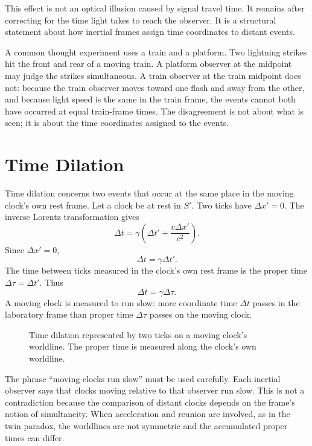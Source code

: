 This effect is not an optical illusion caused by signal travel time. It remains
after correcting for the time light takes to reach the observer. It is a
structural statement about how inertial frames assign time coordinates to
distant events.

A common thought experiment uses a train and a platform. Two lightning strikes
hit the front and rear of a moving train. A platform observer at the midpoint
may judge the strikes simultaneous. A train observer at the train midpoint does
not: because the train observer moves toward one flash and away from the other,
and because light speed is the same in the train frame, the events cannot both
have occurred at equal train-frame times. The disagreement is not about what is
seen; it is about the time coordinates assigned to the events.

\clearpage

\section{Time Dilation}

Time dilation concerns two events that occur at the same place in the moving
clock's own rest frame. Let a clock be at rest in \(S'\). Two ticks have
\(\Delta x'=0\). The inverse Lorentz transformation gives
\[
\Delta t=\gamma\left(\Delta t'+\frac{v\Delta x'}{c^2}\right).
\]
Since \(\Delta x'=0\),
\[
\Delta t=\gamma\Delta t'.
\]
The time between ticks measured in the clock's own rest frame is the proper time
\(\Delta\tau=\Delta t'\). Thus
\[
\boxed{\Delta t=\gamma\Delta\tau.}
\]
A moving clock is measured to run slow: more coordinate time \(\Delta t\) passes
in the laboratory frame than proper time \(\Delta\tau\) passes on the moving
clock.

\begin{figure}[h]
\centering

\caption{Time dilation represented by two ticks on a moving clock's worldline.
The proper time is measured along the clock's own worldline.}
\end{figure}

The phrase ``moving clocks run slow'' must be used carefully. Each inertial
observer says that clocks moving relative to that observer run slow. This is not
a contradiction because the comparison of distant clocks depends on the frame's
notion of simultaneity. When acceleration and reunion are involved, as in the
twin paradox, the worldlines are not symmetric and the accumulated proper times
can differ.

